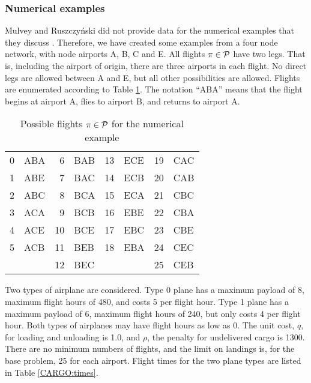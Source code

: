 \subsubsection{Numerical examples}
\label{CARGO:SEC:numex}
Mul\-vey and Ru\-szczy\'{n}\-ski \cite{mulvey95} did not provide data for the numerical examples that they discuss \cite{mulveynote99}.  Therefore, we have created some examples from a four node network, with node airports A, B, C and E.  All flights $\pi \in {\cal P}$ have two legs.  That is, including the airport of origin, there are three airports in each flight.  No direct legs are allowed between A and E, but all other possibilities are allowed.  Flights are enumerated according to Table \ref{CARGO:flights}.  The notation ``ABA'' means that the flight begins at airport A, flies to airport B, and returns to airport A.

\begin{table}[ht]
\caption{Possible flights $\pi \in {\cal P}$ for the numerical example}
\label{CARGO:flights}
\begin{center}
\begin{tabular}{|rlrlrlrl|}
\hline
0 & ABA & 6 & BAB & 13 & ECE & 19 & CAC\\
1 & ABE & 7 & BAC & 14 & ECB & 20 & CAB\\
2 & ABC & 8 & BCA & 15 & ECA & 21 & CBC\\
3 & ACA & 9 & BCB & 16 & EBE & 22 & CBA\\
4 & ACE & 10 & BCE & 17 & EBC & 23 & CBE\\
5 & ACB & 11 & BEB & 18 & EBA & 24 & CEC\\
  &     & 12 & BEC &    &     & 25 & CEB\\
\hline
\end{tabular}
\end{center}
\end{table}

Two types of airplane are considered.  Type 0 plane has a maximum payload of 8, maximum flight hours of 480, and costs 5 per flight hour.  Type 1 plane has a maximum payload of 6, maximum flight hours of 240, but only costs 4 per flight hour.  Both types of airplanes may have flight hours as low as 0.  The unit cost, $q$, for loading and unloading is 1.0, and $\rho$, the penalty for undelivered cargo is 1300.  There are no minimum numbers of flights, and the limit on landings is, for the base problem, 25 for each airport.  Flight times for the two plane types are listed in Table \ref{CARGO:times}.

